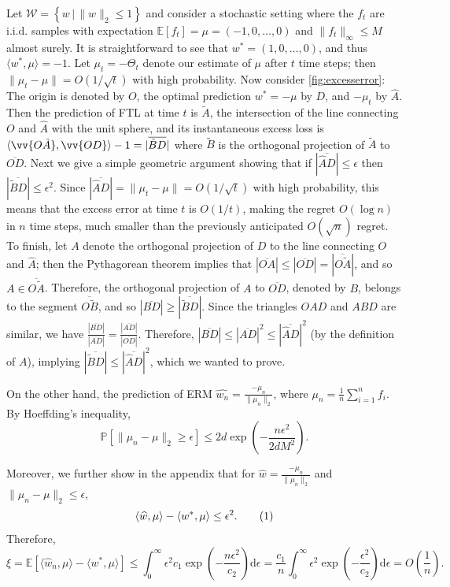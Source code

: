 \documentclass[english]{article}
\newcommand{\cW}{\mathcal{W}}
\newcommand{\Exp}[1]{\mathbb{E}\left[ #1 \right]}
\newcommand{\inpro}[2]{\langle #1, #2\rangle}
\newcommand{\set}[2]{\left\{#1 \,\vert\, #2 \right\}}
\newcommand{\what}[1]{\widehat{#1}}
\newcommand\numberthis{\addtocounter{equation}{1}\tag{\theequation}}
\newcommand{\Prob}[1]{\mathbb{P}\left[#1\right]}
\begin{document}
Let $\cW = \set{w}{\|w\|_2\le 1}$ and consider a stochastic setting where the $f_t$ are i.i.d. samples 
with expectation $\Exp{f_t} = \mu = (-1,0,\ldots,0)$ and $\|f_t\|_\infty\le M$ almost surely.
It is straightforward to see that $w^* = (1,0,\ldots,0)$, and thus $\inpro{w^*}{\mu} = -1$. Let $\mu_t=-\Theta_t$ denote our estimate of $\mu$ after $t$ time steps; then $\|\mu_t-\mu\| = O(1/\sqrt{t})$
with high probability.
Now consider \cref{fig:excesserror}: The origin is denoted by $O$, the optimal prediction $w^*=-\mu$ by $D$, and $-\mu_t$ by $\hat{A}$. Then the prediction of 
FTL at time $t$ is $\tilde{A}$, the intersection of the line connecting $O$ and $\hat{A}$ with the unit sphere, and its instantaneous excess loss is
$\inpro{\vv{O\tilde{A}}}{\vv{OD}} - 1 = |\overline{\tilde{B}D}|$ where $\tilde{B}$ is the orthogonal projection of $\tilde{A}$ to $\overline{OD}$. 
Next we give a simple geometric argument showing that if $|\overline{\hat{A}D}| \le \epsilon$ then $|\overline{\tilde{B}D}| \le \epsilon^2$. Since 
$|\overline{\hat{A}D}|=\|\mu_t - \mu\| = O(1/\sqrt{t})$ with high probability, this means that the excess error at time $t$ is $O(1/t)$, making the regret $O(\log n)$ 
in $n$ time steps, much smaller than the 
previously anticipated $O(\sqrt{n})$ regret. 
To finish, let  $A$ denote the orthogonal projection of $D$ to the line connecting $O$ and $\hat{A}$; then the Pythagorean theorem implies that $|\overline{OA}| \le |\overline{OD}|=|\overline{O\tilde{A}}|$, and so
$A \in \overline{O\tilde{A}}$. Therefore, the orthogonal projection of $A$ to $\overline{OD}$, denoted by $B$, belongs to the segment $\overline{O\tilde{B}}$,
and so $|\overline{BD}| \ge |\overline{\tilde{B}D}|$. Since the triangles $OAD$ and $ABD$ are similar, we have $\frac{|\overline{BD}|}{|\overline{AD}|} = \frac{|\overline{AD}|}{|\overline{OD}|}$. Therefore, 
$|\overline{BD}| \le |\overline{AD}|^2 \le |\overline{\hat{A}D}|^2$ (by the definition of $A$), implying $|\overline{\tilde{B}D}| \le |\overline{\hat{A}D}|^2$, which we wanted to prove.

On the other hand, the prediction of ERM $\what{w_n} = \frac{-\mu_n}{\|\mu_n\|_2}$, where $\mu_n = \frac{1}{n}\sum_{i=1}^n f_i$.
By Hoeffding's inequality, 
\[
\Prob{ \|\mu_n - \mu\|_2 \ge \epsilon } \le 2d\exp\left(-\frac{n\epsilon^2}{2dM^2}\right).
\]

Moreover, we further show in the appendix that for $\what{w} = \frac{-\mu_n}{\|\mu_n\|_2}$ and $\|\mu_n - \mu\|_2 \le \epsilon$, 
\[
\inpro{\what{w}}{\mu} - \inpro{w^*}{\mu} \le \epsilon^2. \numberthis\label{eq:exampleloss}
\]
Therefore,
\[
\xi = \Exp{\inpro{\hat{w}_n}{\mu} - \inpro{w^*}{\mu}} \le \int_{0}^{\infty} \epsilon^2 c_1\exp\left(-\frac{n\epsilon^2}{c_2}\right) \text{d}\epsilon = \frac{c_1}{n}\int_{0}^{\infty} \epsilon^2\exp\left(-\frac{\epsilon^2}{c_2}\right) \text{d}\epsilon = O(\frac{1}{n}).
\]
\fi
\end{document}
